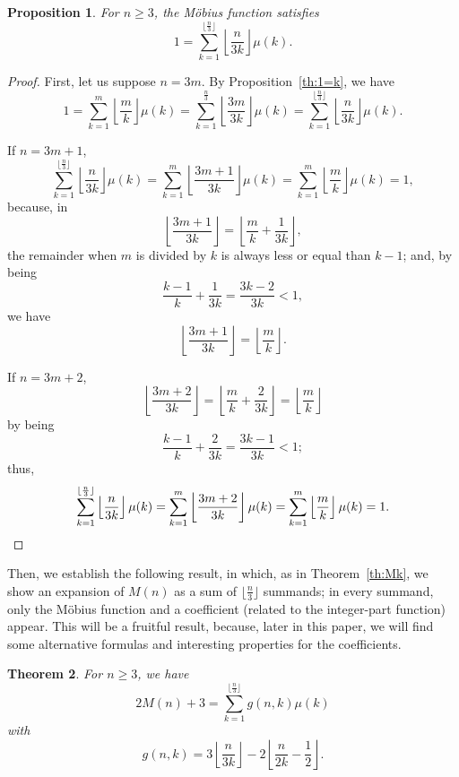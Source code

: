 \documentclass[10pt]{amsart}
\newtheorem{theor}{Theorem}
\newtheorem{propo}[theor]{Proposition}
\begin{document}
\begin{propo}
\label{th:1=3k}
For $n \geq 3$, the M\"obius function satisfies
$$
1 = \sum_{k=1}^{\lfloor\frac{n}3\rfloor}
\left\lfloor \frac {n}{3k}\right\rfloor \mu(k).
$$
\end{propo}

\begin{proof}
First, let us suppose $n=3m$. By Proposition~\ref{th:1=k}, we have
$$
1 = \sum_{k=1}^{m} \left\lfloor \frac{m}{k}\right\rfloor \mu(k)
= \sum_{k=1}^{\frac{n}3} \left\lfloor \frac{3m}{3k}\right\rfloor \mu(k)
= \sum_{k=1}^{\lfloor\frac{n}3\rfloor} \left\lfloor \frac{n}{3k}\right\rfloor \mu(k).
$$

If $n=3m+1$,
$$
\sum_{k=1}^{\lfloor\frac{n}3\rfloor} \left\lfloor \frac {n}{3k}\right\rfloor \mu(k)
= \sum_{k=1}^{m} \left\lfloor \frac{3m+1}{3k}\right\rfloor \mu(k)
= \sum_{k=1}^{m} \left\lfloor \frac{m}{k}\right\rfloor \mu(k) = 1,
$$
because, in
$$
\left\lfloor \frac{3m+1}{3k}\right\rfloor
= \left\lfloor \frac{m}{k} + \frac 1{3k}\right\rfloor,
$$
the remainder when $m$ is divided by $k$ is always less or equal than $k-1$;
and, by being
$$
\frac {k-1}k + \frac 1{3k} = \frac{3k-2}{3k} < 1,
$$
we have
$$
\left\lfloor \frac{3m+1}{3k}\right\rfloor
= \left\lfloor \frac{m}{k}\right\rfloor.
$$

If $n=3m+2$,
$$
\left\lfloor \frac{3m+2}{3k}\right\rfloor
= \left\lfloor \frac{m}{k} + \frac 2{3k}\right\rfloor
= \left\lfloor \frac {m}{k}\right\rfloor
$$
by being
$$
\frac{k-1}{k} + \frac {2}{3k} = \frac{3k-1}{3k} < 1;
$$
thus,
\begin{equation*}
\sum_{k=1}^{\lfloor\frac{n}3\rfloor} \left\lfloor \frac {n}{3k}\right\rfloor \mu(k)
= \sum_{k=1}^{m} \left\lfloor \frac {3m+2}{3k}\right\rfloor \mu(k)
= \sum_{k=1}^{m} \left\lfloor \frac {m}{k}\right\rfloor \mu(k) = 1.
\qedhere
\end{equation*}
\end{proof}

Then, we establish the following result, in which, as in Theorem~\ref{th:Mk},
we show an expansion of $M(n)$ as a sum of $\lfloor\frac{n}3\rfloor$ summands;
in every summand, only the M\"obius function and a coefficient
(related to the integer-part function) appear.
This will be a fruitful result, because, later in this paper, we will find
some alternative formulas and interesting properties for the coefficients.

\begin{theor}
\label{th:2M+3}
For $n \geq 3$, we have
\begin{equation}
\label{eq:2M+3}
2M(n)+3 = \sum_{k=1}^{\lfloor\frac{n}3\rfloor} g(n,k) \mu(k)
\end{equation}
with
\begin{equation}
\label{eq:g}
g(n,k) = 3 \left\lfloor \frac {n}{3k}\right\rfloor
- 2\left\lfloor \frac {n}{2k} - \frac 12 \right\rfloor.
\end{equation}
\end{theor}
\end{document}
